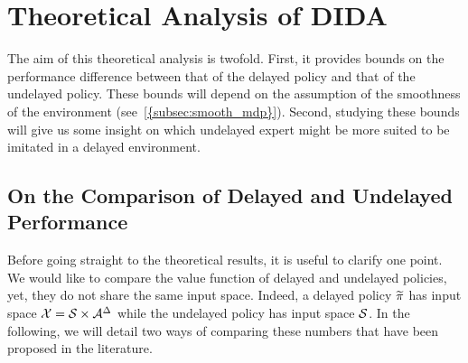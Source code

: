 \section{Theoretical Analysis of DIDA}
\label{sec:th_analysis_imitation}

The aim of this theoretical analysis is twofold. 
First, it provides bounds on the performance difference between that of the delayed policy and that of the undelayed policy. 
These bounds will depend on the assumption of the smoothness of the environment (see~\cref{{subsec:smooth_mdp}}). 
Second, studying these bounds will give us some insight on which undelayed expert might be more suited to be imitated in a delayed environment.  


\subsection{On the Comparison of Delayed and Undelayed Performance}
\label{subsec:compare_delayed_undelayed}

Before going straight to the theoretical results, it is useful to clarify one point. 
We would like to compare the value function of delayed and undelayed policies, yet, they do not share the same input space. 
Indeed, a delayed policy ${\widetilde{\pi}}$ has input space $\mathcal{X}=\mathcal{S}\times\mathcal{A}^\Delta$ while the undelayed policy has input space $\mathcal{S}$. 
In the following, we will detail two ways of comparing these numbers that have been proposed in the literature.

